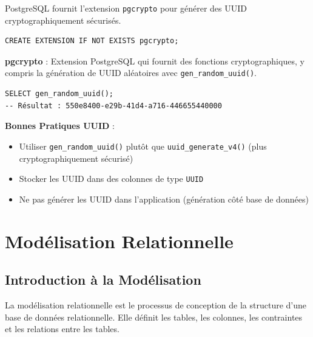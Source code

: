 PostgreSQL fournit l'extension \texttt{pgcrypto} pour générer des UUID cryptographiquement sécurisés.

\begin{lstlisting}[style=sql, caption=Activation de l'extension pgcrypto]
CREATE EXTENSION IF NOT EXISTS pgcrypto;
\end{lstlisting}

\begin{definitionbox}
    \textbf{pgcrypto} : Extension PostgreSQL qui fournit des fonctions cryptographiques, y compris la génération de UUID aléatoires avec \texttt{gen\_random\_uuid()}.
\end{definitionbox}

\begin{lstlisting}[style=sql, caption=Génération d'un UUID]
SELECT gen_random_uuid();
-- Résultat : 550e8400-e29b-41d4-a716-446655440000
\end{lstlisting}

\begin{bestpracticebox}
    \textbf{Bonnes Pratiques UUID} :
    \begin{itemize}
        \item Utiliser \texttt{gen\_random\_uuid()} plutôt que \texttt{uuid\_generate\_v4()} (plus cryptographiquement sécurisé)
        \item Stocker les UUID dans des colonnes de type \texttt{UUID}
        \item Ne pas générer les UUID dans l'application (génération côté base de données)
    \end{itemize}
\end{bestpracticebox}

\chapter{Modélisation Relationnelle}

\section{Introduction à la Modélisation}

La modélisation relationnelle est le processus de conception de la structure d'une base de données relationnelle. Elle définit les tables, les colonnes, les contraintes et les relations entre les tables.

